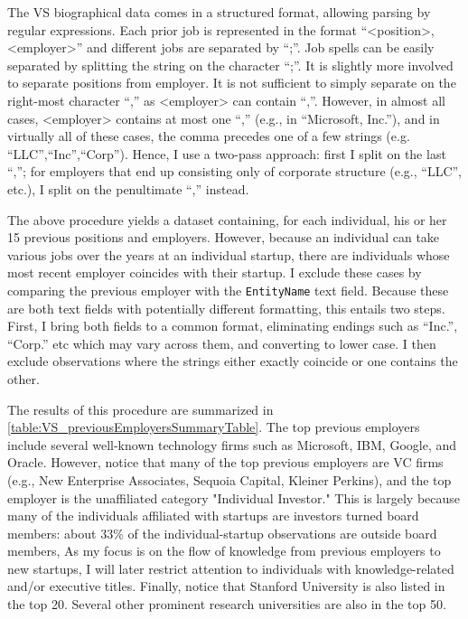 \documentclass[12pt,english]{article}
\theoremstyle{remark}
\begin{document}
The VS biographical data comes in a structured format, allowing parsing by regular expressions. Each prior job is represented in the format ``<position>, <employer>'' and different jobs are separated by ``;''. Job spells can be easily separated by splitting the string on the character ``;''. It is slightly more involved to separate positions from employer. It is not sufficient to simply separate on the right-most character ``,'' as <employer> can contain ``,''. However, in almost all cases, <employer> contains at most one ``,'' (e.g., in ``Microsoft, Inc.''), and in virtually all of these cases, the comma precedes one of a few strings (e.g. ``LLC'',``Inc'',``Corp''). Hence, I use a two-pass approach: first I split on the last ``,''; for employers that end up consisting only of corporate structure (e.g., ``LLC'', etc.), I split on the penultimate ``,'' instead. 

The above procedure yields a dataset containing, for each individual, his or her 15 previous positions and employers. However, because an individual can take various jobs over the years at an individual startup, there are individuals whose most recent employer coincides with their startup. I exclude these cases by comparing the previous employer with the \texttt{EntityName} text field. Because these are both text fields with potentially different formatting, this entails two steps. First, I bring both fields to a common format, eliminating endings such as ``Inc.'', ``Corp.'' etc which may vary across them, and converting to lower case. I then exclude observations where the strings either exactly coincide or one contains the other. 

The results of this procedure are summarized in \autoref{table:VS_previousEmployersSummaryTable}. The top previous employers include several well-known technology firms such as Microsoft, IBM, Google, and Oracle. However, notice that many of the top previous employers are VC firms (e.g., New Enterprise Associates, Sequoia Capital, Kleiner Perkins), and the top employer is the unaffiliated category "Individual Investor." This is largely because many of the individuals affiliated with startups are investors turned board members: about 33\% of the individual-startup observations are outside board members, As my focus is on the flow of knowledge from previous employers to new startups, I will later restrict attention to individuals with knowledge-related and/or executive titles. Finally, notice that Stanford University is also listed in the top 20. Several other prominent research universities are also in the top 50. 
\end{document}
